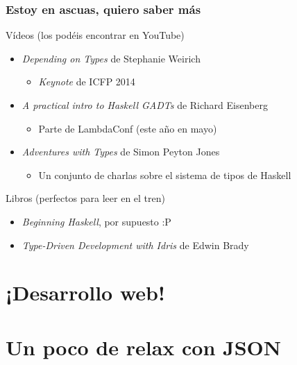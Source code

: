 \documentclass{beamer}
\begin{document}
\begin{frame}[fragile]
\frametitle{Estoy en ascuas, quiero saber más}
Vídeos (los podéis encontrar en YouTube)
\begin{itemize}
\item \emph{Depending on Types} de Stephanie Weirich
\begin{itemize}
\item \emph{Keynote} de ICFP 2014
\end{itemize}
\item \emph{A practical intro to Haskell GADTs} de Richard Eisenberg
\begin{itemize}
\item Parte de LambdaConf (este año en mayo)
\end{itemize}
\item \emph{Adventures with Types} de Simon Peyton Jones
\begin{itemize}
\item Un conjunto de charlas sobre el sistema de tipos de Haskell
\end{itemize}
\end{itemize}

Libros (perfectos para leer en el tren)
\begin{itemize}
\item \emph{Beginning Haskell}, por supuesto :P
\item \emph{Type-Driven Development with Idris} de Edwin Brady
\end{itemize}
\end{frame}

\section{¡Desarrollo web!}

\section{Un poco de relax con JSON}
\end{document}
